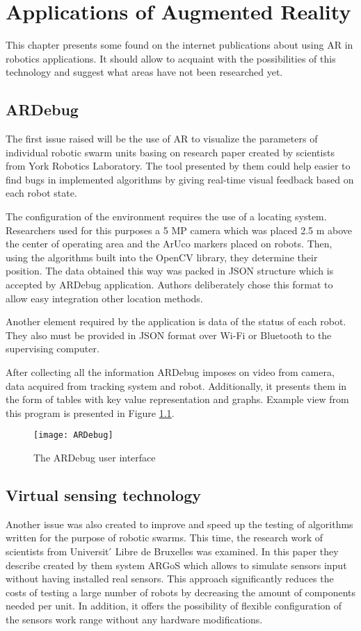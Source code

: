 \documentclass[printmode,en]{mgr}
\begin{document}
\chapter{Applications of Augmented Reality}
This chapter presents some found on the internet publications about using AR in robotics applications. It should allow to acquaint with the possibilities of this technology and suggest what areas have not been researched yet.

\section{ARDebug}
The first issue raised will be the use of AR to visualize the parameters of individual robotic swarm units basing on research paper \cite{ARDebug} created by scientists from York Robotics Laboratory. The tool presented by them could help easier to find bugs in implemented algorithms by giving real-time visual feedback based on each robot state.

The configuration of the environment requires the use of a locating system. Researchers used for this purposes a 5 MP camera which was placed 2.5 m above the center of operating area and the ArUco markers placed on robots. Then, using the algorithms built into the OpenCV library, they determine their position. The data obtained this way was packed in JSON structure which is accepted by ARDebug application. Authors deliberately chose this format to allow easy integration other location methods.

Another element required by the application is data of the status of each robot. They also must be provided in JSON format over Wi-Fi or Bluetooth to the supervising computer.

After collecting all the information ARDebug imposes on video from camera, data acquired from tracking system and robot. Additionally, it presents them in the form of tables with key value representation and graphs. Example view from this program is presented in Figure \ref{fig:ARDebug}.

\begin{figure}[!ht]
  \centering
    \texttt{[image: ARDebug]}
  \caption{The ARDebug user interface \cite{ARDebug}}
  \label{fig:ARDebug}
\end{figure}

\section{Virtual sensing technology}
Another issue was also created to improve and speed up the testing of algorithms written for the purpose of robotic swarms. This time, the research work \cite{ARGoS} of scientists from Universit ́ Libre de Bruxelles was examined. In this paper they describe created by them system ARGoS which allows to simulate sensors input without having installed real sensors. This approach significantly reduces the costs of testing a large number of robots by decreasing the amount of components needed per unit. In addition, it offers the possibility of flexible configuration of the sensors work range without any hardware modifications.
\end{document}
